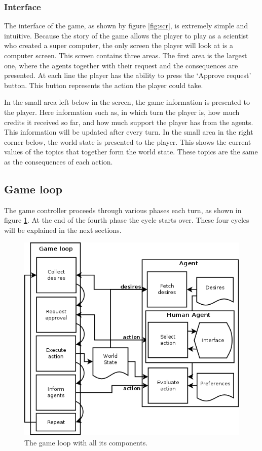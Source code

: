 \documentclass[11pt,a4paper]{article}
\begin{document}
    \subsubsection{Interface}
      The interface of the game, as shown by figure \ref{fig:scr}, is extremely simple and intuitive. Because the story of the game allows the player to play as a scientist who created a super computer, the only screen the player will look at is a computer screen. This screen contains three areas. The first area is the largest one, where the agents together with their request and the consequences are presented. At each line the player has the ability to press the `Approve request' button. This button represents the action the player could take. 

      In the small area left below in the screen, the game information is presented to the player. Here information such as, in which turn the player is, how much credits it received so far, and how much support the player has from the agents. This information will be updated after every turn. In the small area in the right corner below, the world state is presented to the player. This shows the current values of the topics that together form the world state. These topics are the same as the consequences of each action. 

  \subsection{Game loop}
      The game controller proceeds through various phases each turn, as shown in figure \ref{fig:gl}. At the end of the fourth phase the cycle starts over. These four cycles will be explained in the next sections. 
      
  \begin{figure}[h!]
  \centering
	\includegraphics[scale=0.25]{gameloop.png}
	\caption{The game loop with all its components.}
	\label{fig:gl}  
  \end{figure}
 
\end{document}

